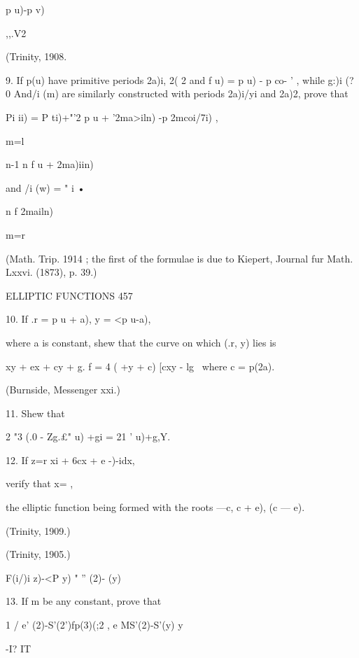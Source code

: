 { p u)-p v) 



,,.V2 



(Trinity, 1908. 



9. If p(u) have primitive periods 2a)i, 2( 2 and f  u) =  p  u) - p  co-  '  , while g:)i (?0 
And/i (m) are similarly constructed with periods 2a)i/yi and 2a)2, prove that 

Pi ii) = P ti)+"'2  p u + '2ma>iln) -p  2mcoi/7i) , 

m=l 

n-1 
n f u + 2ma)iin) 

 and /i (w) = "  i • 

n f 2mailn) 

m=r 

(Math. Trip. 1914 ; the first of the formulae is due to Kiepert, 
Journal fur Math. Lxxvi. (1873), p. 39.) 



ELLIPTIC FUNCTIONS 457 

10. If .r = p u + a), y = <p u-a), 

where a is constant, shew that the curve on which (.r, y) lies is 

 xy + ex + cy +  g. f = 4 (  +y + c) [cxy - lg \   
where c = p(2a). 

(Burnside, Messenger  xxi.) 

11. Shew that 

2 "3 (.0 - Zg.£"   u) +gi = 21   '   u)+g,Y. 



12. If z=r  xi + 6cx  + e -)-idx, 

verify that x=  , 

the elliptic function being formed with the roots —c,    c + e),   (c — e). 



(Trinity, 1909.) 



(Trinity, 1905.) 



F(i/)i   z)-<P y) " ''    (2)- (y) 



13. If m be any constant, prove that 



1 / e'   (2)-S'(2')fp(3)(;2  ,  e MS'(2)-S'(y)  y 



-I? IT 



}
